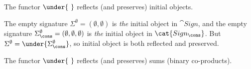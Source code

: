 \begin{lemma}
The functor $\under{\ }$ reflects (and preserves) initial objects.
\end{lemma}
%
\begin{PROOF}
The empty signature $\Sigma^\emptyset=(\emptyset,\emptyset)$ is {\em the}
initial object in 
$\cat{Sign}$, and the empty signature
$\Sigma_\cons^\emptyset=(\emptyset,\emptyset,\emptyset)$ is {\em the} initial
object in
$\cat{Sign_\cons}$.
But $\Sigma^\emptyset=\under{\Sigma_\cons^\emptyset}$, so initial object is
both reflected and preserved.
\end{PROOF}%
%
\begin{lemma} The functor $\under{\ }$ reflects (and preserves) sums (binary co-products).
\end{lemma}
%
